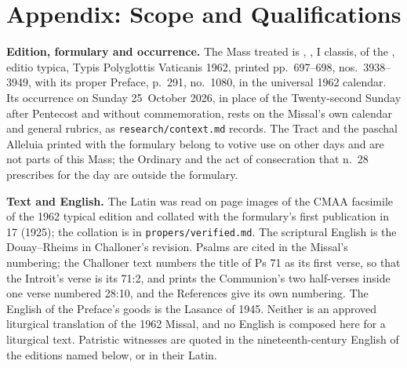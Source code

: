 
\section{Appendix: Scope and Qualifications}

{\footnotesize
\textbf{Edition, formulary and occurrence.} The Mass treated is
, , I classis,
of the , editio typica, Typis Polyglottis Vaticanis 1962,
printed pp.~697--698, nos.~3938--3949, with its proper Preface, p.~291,
no.~1080, in the universal 1962 calendar. Its occurrence on Sunday
25~October 2026, in place of the Twenty-second Sunday after Pentecost and
without commemoration, rests on the Missal's own calendar and general rubrics,
as \texttt{research/context.md} records. The Tract and the paschal Alleluia
printed with the formulary belong to votive use on other days and are not
parts of this Mass; the Ordinary and the act of consecration that  n.~28 prescribes for the day are outside the formulary.

\textbf{Text and English.} The Latin was read on page images of the CMAA
facsimile of the 1962 typical edition and collated with the formulary's first
publication in  17 (1925); the collation is in
\texttt{propers/verified.md}. The scriptural English is the Douay--Rheims in
Challoner's revision. Psalms are cited in the Missal's numbering; the
Challoner text numbers the title of Ps 71 as its first verse, so that the
Introit's verse is its 71:2, and prints the Communion's two half-verses inside
one verse numbered 28:10, and the References give its own numbering. The
English of the Preface's goods is the Lasance
 of 1945. Neither is an approved liturgical translation
of the 1962 Missal, and no English is composed here for a liturgical text.
Patristic witnesses are quoted in the nineteenth-century English of the
editions named below, or in their Latin.

}
